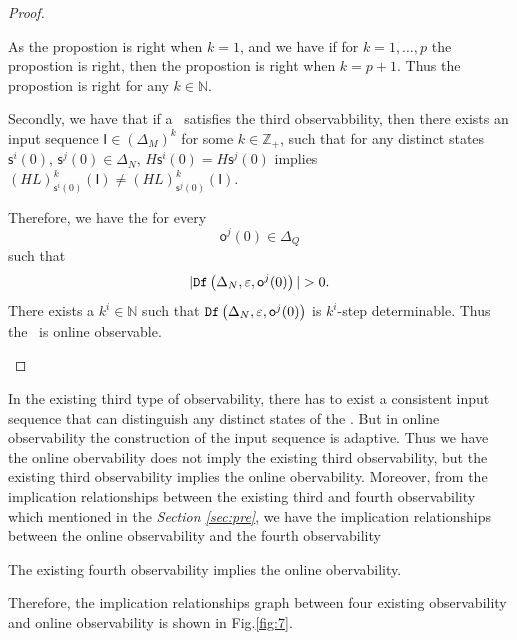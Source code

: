 \begin{proof}
\begin{itemize}
As the propostion is right when $k=1$, and we have if for $k=1,\ldots, p$ the propostion is right, then the propostion is right when $k=p+1$. Thus the propostion is right for any $k\in \mathbb{N}$.

Secondly, we have that if a \BCN\ satisfies the third observabbility, then there exists an input sequence $\mathsf{I}\in(\Delta_M)^k$ for some $k\in \mathbb{Z}_+$, such that for any distinct states $\mathsf{s}^{i}(0)$, $\mathsf{s}^{j}(0) \in \Delta_N$, $H\mathsf{s}^{i}(0)=H\mathsf{s}^{j}(0)$ implies $(HL)^k_{\mathsf{s}^{i}(0)}(\mathsf{I})\neq (HL)^k_{\mathsf{s}^{j}(0)}(\mathsf{I})$. 

Therefore, we have the for every \[\mathsf{o}^{j}(0)\in \Delta_Q\] such that \[|\Ded\left(\Delta_N,\varepsilon, \mathsf{o}^{j}(0)\right)|> 0.\] There exists a $k^{i}\in \mathbb{N}$ such that ${\tt Df}\left(\Delta_N,\varepsilon,\mathsf{o}^{j}(0)\right)$ is $k^{i}$-step determinable. Thus the \BCN\ is online observable.
 \end{itemize}
\end{proof}

In the existing third type of observability, there has to exist a consistent input sequence that can distinguish any distinct states of the \BCN. But in online observability the construction of the input sequence is adaptive. Thus we have the online obervability does not imply the existing third observability, but the existing third observability implies the online obervability. Moreover, from the implication relationships between the existing third and fourth observability which mentioned in the {\em Section \ref{sec:pre}}, we have the implication relationships between the online observability and the fourth observability
\begin{theorem}
The existing fourth observability implies the online obervability.
\label{theo:5}
\end{theorem}

Therefore, the implication relationships graph between four existing observability and online observability is shown in Fig.\ref{fig:7}.


